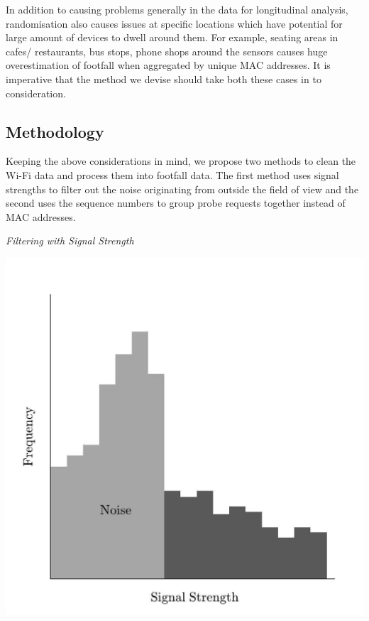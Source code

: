 In addition to causing problems generally in the data for longitudinal analysis, randomisation also causes issues at specific locations which have potential for large amount of devices to dwell around them.
For example, seating areas in cafes/ restaurants, bus stops, phone shops around the sensors causes huge overestimation of footfall when aggregated by unique MAC addresses.
It is imperative that the method we devise should take both these cases in to consideration.

\subsection{Methodology}
Keeping the above considerations in mind, we propose two methods to clean the Wi-Fi data and process them into footfall data.
The first method uses signal strengths to filter out the noise originating from outside the field of view and the second uses the sequence numbers to group probe requests together instead of MAC addresses.

\vspace{1.5em}\noindent\textit{Filtering with Signal Strength}\vspace{0.5em}

\begin{marginfigure}
  \includegraphics[trim={5 5 5 5},clip]{images/processing-method-signal.jpg}
  \caption{}
  \label{figure:processing:method:signal}
\end{marginfigure}

